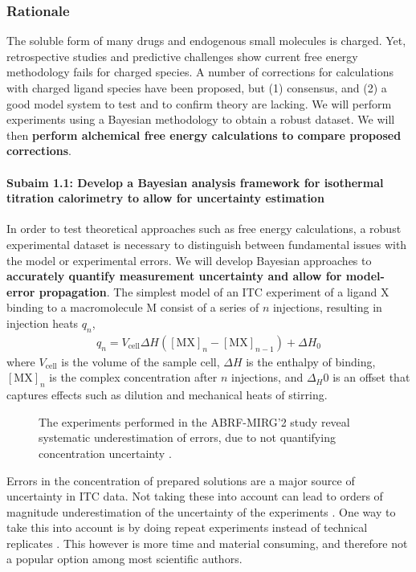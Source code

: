 \documentclass[10pt,final]{article}
\newcommand{\subsubsubsection}[1]{\paragraph*{#1}}
\begin{document}
\subsubsection*{Rationale}
The soluble form of many drugs and endogenous small molecules is charged. Yet, retrospective studies and predictive challenges show current free energy methodology fails for charged species\cite{Rocklin2013b,Muddana2014a}.
A number of corrections for calculations with charged ligand species have been proposed, but (1) consensus, and (2) a good model system to test and to confirm theory are lacking\cite{Reif2013a,Rocklin2013a}. We will perform experiments using a Bayesian methodology to obtain a robust dataset. We will then \textbf{ perform alchemical free energy calculations to compare proposed corrections}.
\subsubsubsection{Subaim 1.1: Develop a Bayesian analysis framework for isothermal titration calorimetry to allow for uncertainty estimation}
In order to test theoretical approaches such as free energy calculations, a robust experimental dataset is necessary to distinguish between fundamental issues with the model or experimental errors. 
We will develop Bayesian approaches to \textbf{accurately quantify measurement uncertainty and allow for model-error propagation}. 
The simplest model of an ITC experiment of a ligand $\mathrm{X}$ binding to a macromolecule $\mathrm{M}$ consist of a series of $n$ injections, resulting in injection heats $q_n$,
\begin{align}
	q_n = V_\mathrm{cell} \Delta H \left( [\mathrm{MX}]_n - [\mathrm{MX}]_{n-1} \right) + \Delta H_0 \label{equation:liberated-heat}
\end{align}
where $V_\mathrm{cell}$ is the volume of the sample cell, $\Delta H$ is the enthalpy of binding, $[\mathrm{MX}]_n$ is the complex concentration after $n$ injections, and $\Delta_H0$ is an offset that captures effects such as dilution and mechanical heats of stirring.
\begin{figure}
	\centering
	\caption{The experiments performed in the ABRF-MIRG'2 study reveal systematic underestimation of errors, due to not quantifying concentration uncertainty \cite{Myszka2003a}.}
\end{figure}
Errors in the concentration of prepared solutions are a major source of uncertainty in ITC data. Not taking these into account can lead to orders of magnitude underestimation of the uncertainty of the experiments \cite{Myszka2003a}. One way to take this into account is by doing repeat experiments instead of technical replicates \cite{Vaux2012a}. This however is more time and material consuming, and therefore not a popular option among most scientific authors. 
\end{document}
